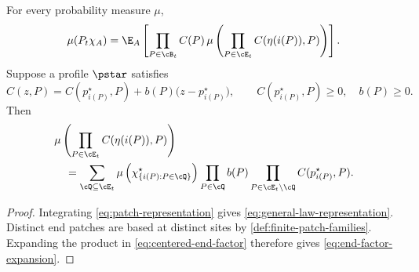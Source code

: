 \begin{proposition}
\label{prop:general-law-representation}
For every probability measure \(\mu\),
\begin{equation}
  \mu(P_t\chi_A)
  =
  \E_A\left[
    \prod_{P\in\cB_t}C(P)\,
    \mu\left(
      \prod_{P\in\cE_t}C(\eta(i(P)),P)
    \right)
  \right].
  \label{eq:general-law-representation}
\end{equation}
Suppose a profile \(\pstar\) satisfies
\begin{equation}
  C(z,P)
  =
  C(p_{i(P)}^\star,P)
  +
  b(P)\bigl(z-p_{i(P)}^\star\bigr),
  \qquad
  C(p_{i(P)}^\star,P)\ge0,\quad b(P)\ge0.
  \label{eq:centered-end-factor}
\end{equation}
Then
\begin{align}
  &\mu\left(
    \prod_{P\in\cE_t}C(\eta(i(P)),P)
  \right)
  \notag\\
  &\quad=
  \sum_{\cQ\subseteq\cE_t}
  \mu\left(
    \chi_{\{i(P):P\in\cQ\}}^\star
  \right)
  \prod_{P\in\cQ}b(P)
  \prod_{P\in\cE_t\setminus\cQ}
  C(p_{i(P)}^\star,P).
  \label{eq:end-factor-expansion}
\end{align}
\end{proposition}

\begin{proof}
Integrating \eqref{eq:patch-representation} gives
\eqref{eq:general-law-representation}. Distinct end patches are based
at distinct sites by \cref{def:finite-patch-families}. Expanding the
product in \eqref{eq:centered-end-factor} therefore gives
\eqref{eq:end-factor-expansion}.
\end{proof}
